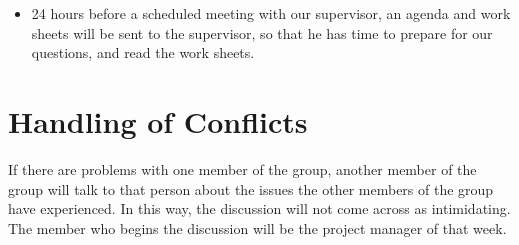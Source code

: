 \documentclass[a4paper,12pt,hidelinks]{article}
\begin{document}
	\begin{itemize}
		\item 24 hours before a scheduled meeting with our supervisor, an agenda and work sheets will be sent to the supervisor, so that he has time to prepare for our questions, and read the work sheets.
	\end{itemize}
	\section*{Handling of Conflicts}
	If there are problems with one member of the group, another member of the group will talk to that person about the issues the other members of the group have experienced. In this way, the discussion will not come across as intimidating. The member who begins the discussion will be the project manager of that week.
\end{document}

